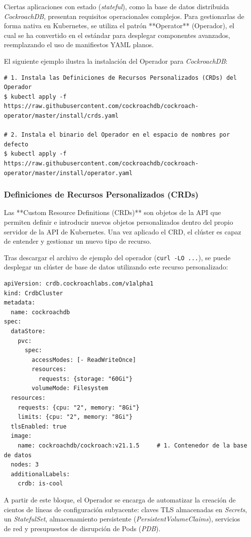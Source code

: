 Ciertas aplicaciones con estado (\textit{stateful}), como la base de datos distribuida \textit{CockroachDB}, presentan requisitos operacionales complejos. Para gestionarlas de forma nativa en Kubernetes, se utiliza el patrón **Operator** (Operador), el cual se ha convertido en el estándar para desplegar componentes avanzados, reemplazando el uso de manifiestos YAML planos.

El siguiente ejemplo ilustra la instalación del Operador para \textit{CockroachDB}:
\begin{verbatim}
# 1. Instala las Definiciones de Recursos Personalizados (CRDs) del Operador
$ kubectl apply -f https://raw.githubusercontent.com/cockroachdb/cockroach-operator/master/install/crds.yaml

# 2. Instala el binario del Operador en el espacio de nombres por defecto
$ kubectl apply -f https://raw.githubusercontent.com/cockroachdb/cockroach-operator/master/install/operator.yaml
\end{verbatim}

\subsubsection{Definiciones de Recursos Personalizados (CRDs)}
Las **Custom Resource Definitions (CRDs)** son objetos de la API que permiten definir e introducir nuevos objetos personalizados dentro del propio servidor de la API de Kubernetes. Una vez aplicado el CRD, el clúster es capaz de entender y gestionar un nuevo tipo de recurso.

Tras descargar el archivo de ejemplo del operador (\texttt{curl -LO ...}), se puede desplegar un clúster de base de datos utilizando este recurso personalizado:

\begin{verbatim}
apiVersion: crdb.cockroachlabs.com/v1alpha1
kind: CrdbCluster
metadata:
  name: cockroachdb
spec:
  dataStore:
    pvc:
      spec:
        accessModes: [- ReadWriteOnce]
        resources:
          requests: {storage: "60Gi"}
        volumeMode: Filesystem
  resources:
    requests: {cpu: "2", memory: "8Gi"}
    limits: {cpu: "2", memory: "8Gi"}
  tlsEnabled: true
  image:
    name: cockroachdb/cockroach:v21.1.5     # 1. Contenedor de la base de datos
  nodes: 3
  additionalLabels:
    crdb: is-cool
\end{verbatim}

A partir de este bloque, el Operador se encarga de automatizar la creación de cientos de líneas de configuración subyacente: claves TLS almacenadas en \textit{Secrets}, un \textit{StatefulSet}, almacenamiento persistente (\textit{PersistentVolumeClaims}), servicios de red y presupuestos de disrupción de Pods (\textit{PDB}).

